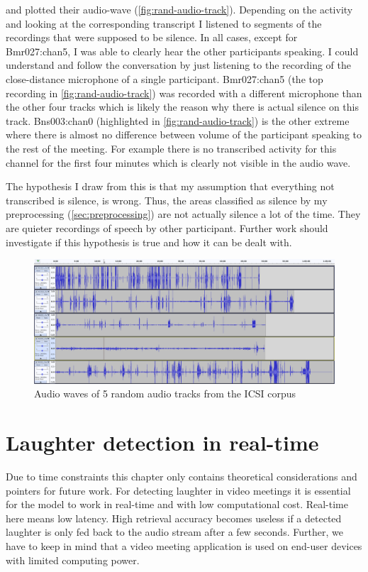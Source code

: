 \documentclass[bsc,frontabs,parskip,deptreport]{infthesis}
\begin{document}
and plotted their audio-wave (\autoref{fig:rand-audio-track}). 
Depending on the activity and looking at the corresponding transcript I listened to segments of the recordings that were supposed to be silence. In all cases, except for Bmr027:chan5, I was able to clearly hear the other participants speaking. I could understand and follow the conversation by just listening to the recording of the close-distance microphone of a single participant. 
Bmr027:chan5 (the top recording in \autoref{fig:rand-audio-track}) was recorded with a different microphone than the other four tracks which is likely the reason why there is actual silence on this track.
Bns003:chan0 (highlighted in \autoref{fig:rand-audio-track}) is the other extreme where there is almost no difference between volume of the participant speaking to the rest of the meeting. For example there is no transcribed activity for this channel for the first four minutes which is clearly not visible in the audio wave. 

The hypothesis I draw from this is that my assumption that everything not transcribed is silence, is wrong. Thus, the areas classified as silence by my preprocessing (\ref{sec:preprocessing}) are not actually silence a lot of the time. They are quieter recordings of speech by other participant. 
Further work should investigate if this hypothesis is true and how it can be dealt with. 

\begin{figure}
    \centering
    \includegraphics[width=14cm]{imgs/plotted_audio_waves.png}
    \caption{Audio waves of 5 random audio tracks from the ICSI corpus}
    \label{fig:rand-audio-track}
\end{figure}


\chapter{Laughter detection in real-time} \label{cha:real-time}
Due to time constraints this chapter only contains theoretical considerations and pointers for future work. 
For detecting laughter in video meetings it is essential for the model to work in real-time and with low computational cost. Real-time here means low latency.
High retrieval accuracy becomes useless if a detected laughter is only fed back to the audio stream after a few seconds.
Further, we have to keep in mind that a video meeting application is used on end-user devices with limited computing power. 
\end{document}
